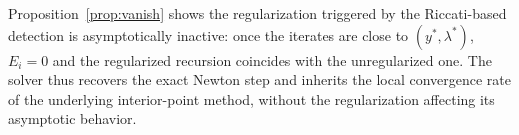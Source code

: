 \documentclass[class=scrbook, crop=false]{standalone}
\begin{document}
Proposition~\ref{prop:vanish} shows the regularization triggered by the Riccati-based detection
is asymptotically inactive: once the iterates are close to $(y^*,\lambda^*)$, $E_i=0$ and the regularized recursion coincides
with the unregularized one. 
The solver thus recovers the exact Newton step and inherits the local convergence rate of the underlying interior-point method, 
without the regularization affecting its asymptotic behavior.
\end{document}
